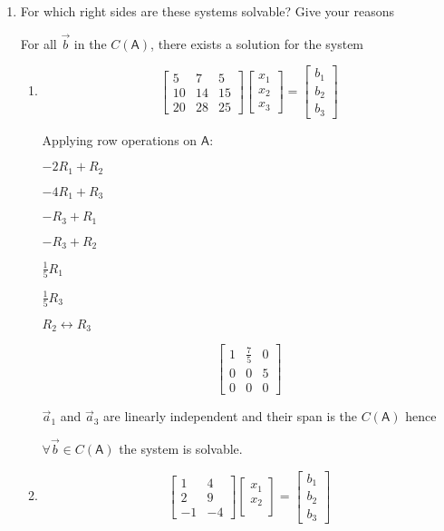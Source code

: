 \documentclass[a4paper, 11pt]{article}
\newcommand{\mat}[1]{\boldsymbol { \mathsf{#1}} }
\begin{document}
\begin{enumerate}
\item For which right sides are these systems solvable? Give your reasons

For all $\vec b$ in the $C(\mat A)$, there exists a solution for the system

\begin{enumerate}
\item
\[ 
\left[ \begin{array}{ccc}
5  &   7 &  5\\
10  &   14 &  15\\
20 & 28 & 25
\end{array} \right]
%
\left[ \begin{array}{c}
 x_1\\
 x_2\\
x_3 
\end{array} \right]
%
= \left[ \begin{array}{c}
 b_1\\
 b_2\\
 b_3 
\end{array} \right]
\]

Applying row operations on $\mat A$: 

\begin{center}
$-2R_1 + R_2$

$-4R_1 + R_3$

$-R_3 + R_1$

$-R_3 + R_2$

$\frac{1}{5} R_1$

$\frac{1}{5} R_3$

$ R_2 \leftrightarrow R_3$
\end{center}


\[ 
\left[ \begin{array}{ccc}
1  & \frac{7}{5} &  0\\
0  &   0 &  5\\
0 & 0 & 0
\end{array} \right]
\]

$\vec a_1$ and $\vec a_3$ are linearly independent and their span is the $C(\mat A)$ hence 

$\forall \vec b \in C(\mat A)$  the system is solvable.


\item
\[ 
\left[ \begin{array}{cc}
1  &   4 \\
2  &  9 \\
-1 & -4 
\end{array} \right]
%
\left[ \begin{array}{c}
 x_1\\
 x_2\\
\end{array} \right]
%
= \left[ \begin{array}{c}
 b_1\\
 b_2\\
 b_3 
\end{array} \right]
\]


\end{enumerate}
\end{enumerate}
\end{document}
